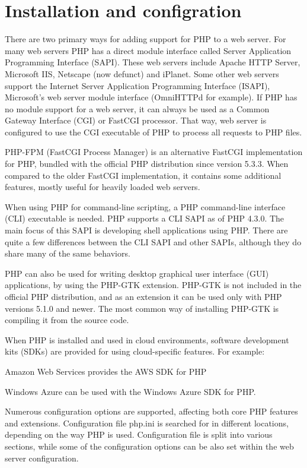\chapter{Installation and configration}

There are two primary ways for adding support for PHP to a web server. For many web servers PHP has a direct module interface called Server Application Programming Interface (SAPI). These web servers include Apache HTTP Server, Microsoft IIS, Netscape (now defunct) and iPlanet. Some other web servers support the Internet Server Application Programming Interface (ISAPI), Microsoft's web server module interface (OmniHTTPd for example). If PHP has no module support for a web server, it can always be used as a Common Gateway Interface (CGI) or FastCGI processor. That way, web server is configured to use the CGI executable of PHP to process all requests to PHP files.


PHP-FPM (FastCGI Process Manager) is an alternative FastCGI implementation for PHP, bundled with the official PHP distribution since version 5.3.3. When compared to the older FastCGI implementation, it contains some additional features, mostly useful for heavily loaded web servers.

When using PHP for command-line scripting, a PHP command-line interface (CLI) executable is needed. PHP supports a CLI SAPI as of PHP 4.3.0. The main focus of this SAPI is developing shell applications using PHP. There are quite a few differences between the CLI SAPI and other SAPIs, although they do share many of the same behaviors.

PHP can also be used for writing desktop graphical user interface (GUI) applications, by using the PHP-GTK extension. PHP-GTK is not included in the official PHP distribution, and as an extension it can be used only with PHP versions 5.1.0 and newer. The most common way of installing PHP-GTK is compiling it from the source code.


When PHP is installed and used in cloud environments, software development kits (SDKs) are provided for using cloud-specific features. For example:


\begin{compactitem}
\item Amazon Web Services provides the AWS SDK for PHP
\item Windows Azure can be used with the Windows Azure SDK for PHP.
\end{compactitem}

Numerous configuration options are supported, affecting both core PHP features and extensions. Configuration file php.ini is searched for in different locations, depending on the way PHP is used. Configuration file is split into various sections, while some of the configuration options can be also set within the web server configuration.


